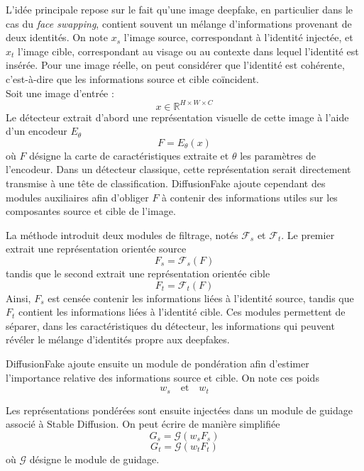 \documentclass[runningheads]{llncs}
\begin{document}
L'idée principale repose sur le fait qu'une image deepfake, en particulier dans le cas du \textit{face swapping}, contient souvent un mélange d'informations provenant de deux identités. On note $x_s$ l'image source, correspondant à l'identité injectée, et $x_t$ l'image cible, correspondant au visage ou au contexte dans lequel l'identité est insérée. Pour une image réelle, on peut considérer que l'identité est cohérente, c'est-à-dire que les informations source et cible coïncident.\\
Soit une image d'entrée :
$$
    x \in \mathbb{R}^{H \times W \times C}
$$
Le détecteur extrait d'abord une représentation visuelle de cette image à l'aide d'un encodeur $E_\theta$
$$
    F = E_\theta(x)
$$
où $F$ désigne la carte de caractéristiques extraite et $\theta$ les paramètres de l'encodeur. Dans un détecteur classique, cette représentation serait directement transmise à une tête de classification. DiffusionFake ajoute cependant des modules auxiliaires afin d'obliger $F$ à contenir des informations utiles sur les composantes source et cible de l'image.

La méthode introduit deux modules de filtrage, notés $\mathcal{F}_s$ et $\mathcal{F}_t$. Le premier extrait une représentation orientée source 
$$
    F_s = \mathcal{F}_s(F)
$$
tandis que le second extrait une représentation orientée cible 
$$
    F_t = \mathcal{F}_t(F)
$$
Ainsi, \(F_s\) est censée contenir les informations liées à l'identité source, tandis que \(F_t\) contient les informations liées à l'identité cible. Ces modules permettent de séparer, dans les caractéristiques du détecteur, les informations qui peuvent révéler le mélange d'identités propre aux deepfakes.

DiffusionFake ajoute ensuite un module de pondération afin d'estimer l'importance relative des informations source et cible. On note ces poids 
$$
    w_s \quad \text{et} \quad w_t
$$

Les représentations pondérées sont ensuite injectées dans un module de guidage associé à Stable Diffusion. On peut écrire de manière simplifiée 
$$
    G_s = \mathcal{G}(w_s F_s)
$$
$$
    G_t = \mathcal{G}(w_t F_t)
$$
où \(\mathcal{G}\) désigne le module de guidage.
\end{document}
